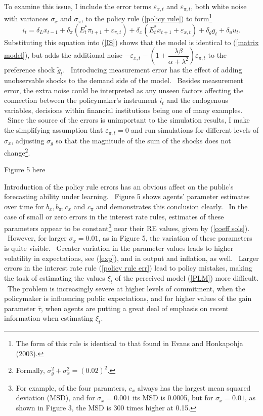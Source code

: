 \documentclass{article}
\begin{document}
\begin{doublespace}
To examine this issue, I include the error terms $\varepsilon _{x,t}$ and $%
\varepsilon _{\pi ,t}$, both white noise with variances $\sigma _{x}$ and $%
\sigma _{\pi }$, to the policy rule (\ref{policy rule}) to form\footnote{%
The form of this rule is identical to that found in Evans and Honkapohja
(2003).}%
\begin{equation}
i_{t}=\delta _{L}x_{t-1}+\delta _{\pi }\left( E_{t}^{\ast }\pi 
_{t+1}+\varepsilon _{\pi ,t}\right) +\delta _{x}\left( E_{t}^{\ast
}x_{t+1}+\varepsilon _{x,t}\right) +\delta _{g}g_{t}+\delta _{u}u_{t}.
\label{policy rule err}
\end{equation}%
Substituting this equation into (\ref{IS}) shows that the model is identical
to (\ref{matrix model}), but adds the additional noise $-\varepsilon 
_{x,t}-\left( 1+\dfrac{\lambda \beta }{\alpha +\lambda ^{2}}\right)
\varepsilon _{\pi ,t}$ to the preference shock $\widetilde{g}_{t}$. \
Introducing measurement error has the effect of adding unobservable shocks
to the demand side of the model. \ Besides measurement error, the extra
noise could be interpreted as any unseen factors affecting the connection
between the policymaker's instrument $i_{t}$ and the endogenous variables,
decisions within financial institutions being one of many examples. \ Since
the source of the errors is unimportant to the simulation results, I make
the simplifying assumption that $\varepsilon _{\pi ,t}=0$ and run
simulations for different levels of $\sigma _{x}$, adjusting $\sigma _{g}$
so that the magnitude of the sum of the shocks does not change\footnote{%
Formally, $\sigma _{g}^{2}+\sigma _{x}^{2}=\left( 0.02\right) ^{2}.$}.

\begin{center}
Figure 5 here
\end{center}

Introduction of the policy rule errors has an obvious affect on the public's
forecasting ability under learning. \ Figure 5 shows agents' parameter
estimates over time for $b_{x},b_{\pi },c_{x}$ and $c_{\pi }$ and
demonstrates this conclusion clearly. \ In the case of small or zero errors
in the interest rate rules, estimates of these parameters appear to be
constant\footnote{%
For example, of the four paramters, $c_{x}$ always has the largest mean
squared deviation (MSD), and for $\sigma _{x}=0.001$ its MSD is 0.0005, but
for $\sigma _{x}=0.01$, as shown in Figure 3, the MSD is 300 times higher at
0.15.} near their RE values, given by (\ref{coeff sols}). \ However, for
larger $\sigma _{x}=0.01$, as in Figure 5, the variation of these parameters
is quite visible. \ Greater variation in the parameter values leads to
higher volatility in expectations, see (\ref{exp}), and in output and
inflation, as well. \ Larger errors in the interest rate rule (\ref{policy
rule err}) lead to policy mistakes, making the task of estimating the values 
$\xi _{t}$ of the perceived model (\ref{PLM}) more difficult. \ The problem
is increasingly severe at higher levels of commitment, when the policymaker
is influencing public expectations, and for higher values of the gain
parameter $\bar{\tau}$, when agents are putting a great deal of emphasis on
recent information when estimating $\xi _{t}$.


\end{doublespace}
\end{document}
